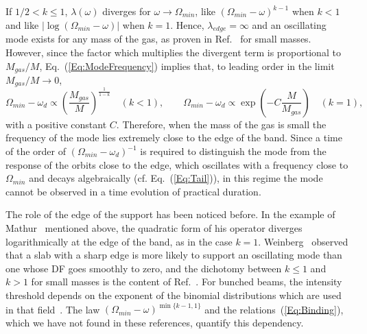 If $1/2 < k\leq 1$, $\lambda(\omega)$ diverges for $\omega\to \Omega_{min}$, like $(\Omega_{min} - \omega)^{k-1}$ when $k < 1$ and like $|\log(\Omega_{min} - \omega)|$ when $k = 1$. Hence, $\lambda_{edge} = \infty$ and an oscillating mode exists for any mass of the gas, as proven in Ref.~\cite{mHgRmScS25} for small masses. However, since the factor which multiplies the divergent term is proportional to $M_{gas}/M$, Eq.~(\ref{Eq:ModeFrequency}) implies that, to leading order in the limit $M_{gas}/M\to 0$,
\begin{equation}
\Omega_{min} - \omega_d\propto \left( \frac{M_{gas}}{M} \right)^{\frac{1}{1-k}}\quad (k < 1),\qquad
\Omega_{min} - \omega_d\propto \exp\left( -C\frac{M}{M_{gas}} \right)\quad (k = 1),
\label{Eq:Binding}
\end{equation}
with a positive constant $C$. Therefore, when the mass of the gas is small the frequency of the mode lies extremely close to the edge of the band. Since a time of the order of $(\Omega_{min} - \omega_d)^{-1}$ is required to distinguish the mode from the response of the orbits close to the edge, which oscillates with a frequency close to $\Omega_{min}$ and decays algebraically (cf. Eq.~(\ref{Eq:Tail})), in this regime the mode cannot be observed in a time evolution of practical duration.

The role of the edge of the support has been noticed before. In the example of Mathur~\cite{sM90} mentioned above, the quadratic form of his operator diverges logarithmically at the edge of the band, as in the case $k = 1$. Weinberg~\cite{mW91} observed that a slab with a sharp edge is more likely to support an oscillating mode than one whose DF goes smoothly to zero, and the dichotomy between $k\leq 1$ and $k > 1$ for small masses is the content of Ref.~\cite{mHgRmScS25}. For bunched beams, the intensity threshold depends on the exponent of the binomial distributions which are used in that field~\cite{iKtAeS21}. The law $(\Omega_{min} - \omega)^{\min\{ k-1,1 \}}$ and the relations~(\ref{Eq:Binding}), which we have not found in these references, quantify this dependency.

